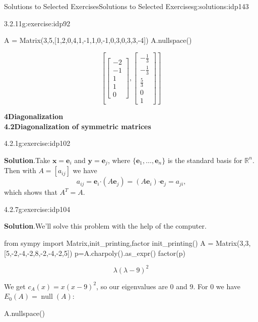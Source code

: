 \documentclass[oneside,10pt,]{book}
\newcommand{\blocktitlefont}{\relax}
\numberwithin{equation}{section}
\newcommand{\bbm}{\begin{bmatrix}}
\newcommand{\ebm}{\end{bmatrix}}
\newcommand{\R}{\mathbb{R}}
\newcommand{\nll}{\operatorname{null}}
\newcommand{\dotp}{\!\boldsymbol{\cdot}\!}
\newcommand{\xx}{\mathbf{x}}
\newcommand{\yy}{\mathbf{y}}
\begin{document}
\begin{solutions-chapter}{Solutions to Selected Exercises}{}{Solutions to Selected Exercises}{}{}{g:solutions:idp143}
\begin{inlinesolution}{3.2.11}{}{g:exercise:idp92}
\begin{sageinput}
A = Matrix(3,5,[1,2,0,4,1,-1,1,0,-1,0,3,0,3,3,-4])
A.nullspace()
\end{sageinput}
\begin{sageoutput}
\[\left[\bbm -2\\-1\\1\\1\\0\ebm, \bbm -\frac13\\ -\frac13\\ \frac53\\0\\1\ebm\right]\]
\end{sageoutput}
\end{inlinesolution}%
\par\medskip
\noindent\textbf{\Large{}4\space\textperiodcentered\space{}Diagonalization\\
4.2\space\textperiodcentered\space{}Diagonalization of symmetric matrices}
\begin{inlinesolution}{4.2.1}{}{g:exercise:idp102}%
\par\smallskip%
\noindent\textbf{\blocktitlefont Solution}.\hypertarget{g:solution:idp171-back}{}\quad{}Take \(\xx=\mathbf{e}_i\) and \(\yy=\mathbf{e}_j\), where \(\{\mathbf{e}_1,\ldots, \mathbf{e}_n\}\) is the standard basis for \(\R^n\). Then with \(A = [a_{ij}]\) we have%
\begin{equation*}
a_{ij} =\mathbf{e}_i\dotp(A\mathbf{e}_j) = (A\mathbf{e}_i)\dotp \mathbf{e}_j = a_{ji}\text{,}
\end{equation*}
which shows that \(A^T=A\).%
\end{inlinesolution}%
\begin{inlinesolution}{4.2.7}{}{g:exercise:idp104}%
\par\smallskip%
\noindent\textbf{\blocktitlefont Solution}.\hypertarget{g:solution:idp172-back}{}\quad{}We'll solve this problem with the help of the computer.%
\begin{sageinput}
from sympy import Matrix,init_printing,factor
init_printing()
A = Matrix(3,3,[5,-2,-4,-2,8,-2,-4,-2,5])
p=A.charpoly().as_expr()
factor(p)
\end{sageinput}
\begin{sageoutput}
\[\lambda(\lambda-9)^2\]
\end{sageoutput}
We get \(c_A(x)=x(x-9)^2\), so our eigenvalues are \(0\) and \(9\). For \(0\) we have \(E_0(A) = \nll(A)\):%
\begin{sageinput}
A.nullspace()
\end{sageinput}
\begin{sageoutput}

\end{sageoutput}
\end{inlinesolution}
\end{solutions-chapter}
\end{document}
